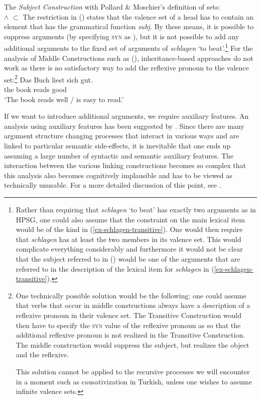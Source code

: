 \ea
The \emph{Subject Construction} with Pollard \& Moschier's definition of sets:\\
 $\wedge$  $\subset$ 
\z
The restriction in () states that the valence set of a head has to contain an element that has the grammatical function \emph{subj}.
By these means, it is possible to suppress arguments (by specifying \textsc{syn} as ),
but it is not possible to add any additional arguments to the fixed set of arguments of
\emph{schlagen} `to beat'.\footnote{%
  Rather than requiring that \emph{schlagen} `to beat' has exactly two arguments as in HPSG, one could also assume that the constraint on the main lexical item would be of the kind in
  (\ref{ex-schlagen-transitive}). One would then require that \emph{schlagen} has at least the two
members in its valence set. This would complicate everything considerably and furthermore it would
not be clear that the subject referred to in () would be one of the arguments that are
referred to in the description of the lexical item for \emph{schlagen} in (\ref{ex-schlagen-transitive}). 
}
For the analysis of Middle Constructions such as (), inheritance-based approaches do not work as there is no
satisfactory way to add the reflexive pronoun to the valence set:\footnote{%
	One technically possible solution would be the following: one could assume that verbs that occur in middle constructions always have a description
	of a reflexive pronoun in their valence set. The Transitive Construction would then have to
        specify the \textsc{syn} value of the reflexive pronoun
	as  so that the additional reflexive pronoun is not realized in the Transitive Construction. The middle construction would suppress the subject,
	but realizes the object and the reflexive.

		This solution cannot be applied to the recursive processes we will encounter in a moment such as causativization in Turkish, unless one
		wishes to assume infinite valence sets.
}
\ea
\gll Das Buch liest sich gut.\\
	 the book reads  good\\
\glt `The book reads well / is easy to read.'
\z

\noindent
If we want to introduce additional arguments, we require auxiliary features. An analysis using auxiliary features has been suggested by 
\citet{Koenig99a}. Since there are many argument structure changing processes that interact in various ways and are linked to particular
semantic side-effects, it is inevitable that one ends up assuming a large number of syntactic and semantic auxiliary features.
The interaction between the various linking constructions becomes so complex that this analysis also becomes cognitively implausible
and has to be viewed as technically unusable. For a more detailed discussion of this point, see .

